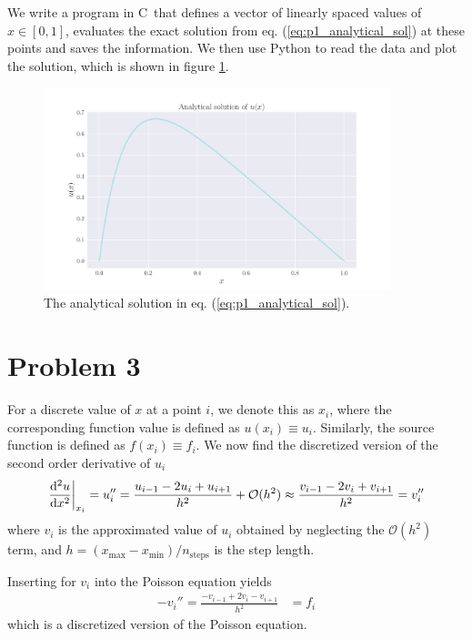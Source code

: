 \documentclass[english,notitlepage,nofootinbib]{revtex4-1}  %
\newcommand{\Eq}[1]{eq. (\ref{eq:#1})}
\newcommand{\CC}{C\nolinebreak\hspace{-.05em}\raisebox{.4ex}{\tiny\bf +}\nolinebreak\hspace{-.10em}\raisebox{.4ex}{\tiny\bf +}}
\begin{document}
We write a program in \CC\ that defines a vector of linearly spaced values of $x\in[0,1]$, evaluates the exact solution from \Eq{p1_analytical_sol} at these points and saves the information. We then use Python to read the data and plot the solution, which is shown in figure \ref{fig:p1_analytical_sol}.


\begin{figure}[h!]
    \centering
    \includegraphics[width=0.9\textwidth]{ux.pdf}
    \caption{The analytical solution in \Eq{p1_analytical_sol}.}
    \label{fig:p1_analytical_sol}
\end{figure}

\section*{Problem 3}
For a discrete value of $x$ at a point $i$, we denote this as $x_i$, where the corresponding function value is defined as $u(x_i)\equiv u_i$. Similarly, the source function is defined as $f(x_i)\equiv f_i$. We now find the discretized version of the second order derivative of $u_i$
\begin{align*}
    \dv[2]{u}{x}\bigg\rvert_{x_i} = u_i'' = \frac{u_{i-1}-2u_i+u_{i+1}}{h^2} + \mathcal{O}(h^2) \approx \frac{v_{i-1}-2v_i+v_{i+1}}{h^2} = v_i''
\end{align*}
where $v_i$ is the approximated value of $u_i$ obtained by neglecting the $\mathcal{O}(h^2)$ term, and $h=(x_{\mathrm{max}}-x_{\mathrm{min}})/n_{\mathrm{steps}}$ is the step length. %

Inserting for $v_i$ into the Poisson equation yields 
\begin{align}
    -v_i'' = \frac{-v_{i-1}+2v_i-v_{i+1}}{h^2} &= f_i \label{eq:p3_disc_poisson_eq} 
\end{align}
which is a discretized version of the Poisson equation. 
\end{document}
